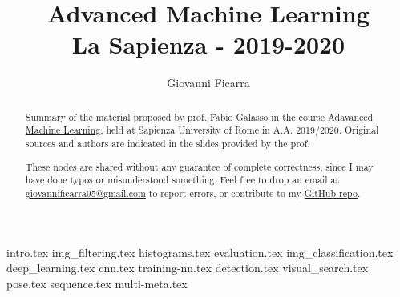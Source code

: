 \documentclass{article}
\title{
    Advanced Machine Learning \\
    \Large La Sapienza - 2019-2020
}
\author{Giovanni Ficarra}
\theoremstyle{definition}
\theoremstyle{remark}
\theoremstyle{remark}
\begin{document}
    
\maketitle

\begin{abstract}
    Summary of the material proposed by prof. Fabio Galasso in the course \href{https://sites.google.com/di.uniroma1.it/aml-19-20}{Adavanced Machine Learning}, held at Sapienza University of Rome in A.A. 2019/2020. Original sources and authors are indicated in the slides provided by the prof.
    
    These nodes are shared without any guarantee of complete correctness, since I may have done typos or misunderstood something. Feel free to drop an email at \href{mailto:giovannificarra95@gmail.com}{giovannificarra95@gmail.com} to report errors, or contribute to my \href{https://github.com/GioFic95/AML-19-20-notes}{GitHub repo}.
\end{abstract}

\tableofcontents

\newpage
{intro.tex}
\newpage
{img_filtering.tex}
\newpage
{histograms.tex}
\newpage
{evaluation.tex}
\newpage
{img_classification.tex}
\newpage
{deep_learning.tex}
\newpage
{cnn.tex}
\newpage
{training-nn.tex}
\newpage
{detection.tex}
\newpage
{visual_search.tex}
\newpage
{pose.tex}
\newpage
{sequence.tex}
\newpage
{multi-meta.tex}
\end{document}
